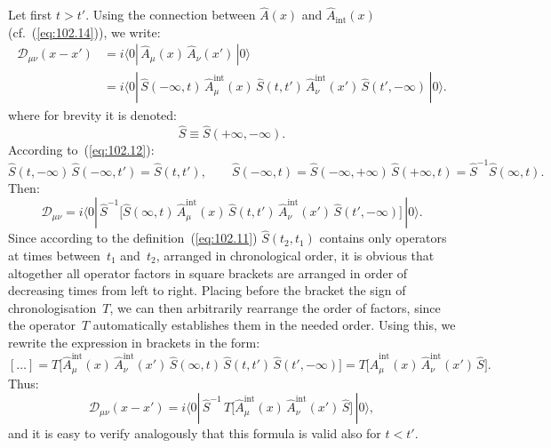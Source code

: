 Let first $t > t'$. Using the connection between $\hat{A}(x)$ and $\hat{A}_{\mathrm{int}}(x)$ (cf.~(\ref{eq:102.14})), we write:
\begin{equation}
\begin{split}
\mathcal{D}_{\mu\nu}(x - x') &= i\langle 0|\,\hat{A}_\mu(x)\,\hat{A}_\nu(x')\,|0\rangle \\
&= i\langle 0|\,\hat{S}(-\infty, t)\,\hat{A}_{\mu}^{\mathrm{int}}(x)\,\hat{S}(t, t')\,\hat{A}_{\nu}^{\mathrm{int}}(x')\,\hat{S}(t', -\infty)\,|0\rangle.
\end{split}
\label{eq:103.3}
\end{equation}
where for brevity it is denoted:
\begin{equation}
\hat{S} \equiv \hat{S}(+\infty, -\infty).
\label{eq:103.4}
\end{equation}
According to~(\ref{eq:102.12}):
\[
\hat{S}(t, -\infty)\,\hat{S}(-\infty, t') = \hat{S}(t, t'),\qquad
\hat{S}(-\infty, t) = \hat{S}(-\infty, +\infty)\,\hat{S}(+\infty, t) = \hat{S}^{-1}\hat{S}(\infty, t).
\]
Then:
\[
\mathcal{D}_{\mu\nu} = i\langle 0|\,\hat{S}^{-1}\bigl[\hat{S}(\infty, t)\,\hat{A}_{\mu}^{\mathrm{int}}(x)\,\hat{S}(t, t')\,\hat{A}_{\nu}^{\mathrm{int}}(x')\,\hat{S}(t', -\infty)\bigr]\,|0\rangle.
\]
Since according to the definition~(\ref{eq:102.11}) $\hat{S}(t_2, t_1)$ contains only operators at times between~$t_1$ and~$t_2$, arranged in chronological order, it is obvious that altogether all operator factors in square brackets are arranged in order of decreasing times from left to right. Placing before the bracket the sign of chronologisation~$T$, we can then arbitrarily rearrange the order of factors, since the operator~$T$ automatically establishes them in the needed order. Using this, we rewrite the expression in brackets in the form:
\[
[\ldots] = T\bigl[\hat{A}_{\mu}^{\mathrm{int}}(x)\,\hat{A}_{\nu}^{\mathrm{int}}(x')\,\hat{S}(\infty, t)\,\hat{S}(t, t')\,\hat{S}(t', -\infty)\bigr] = T\bigl[\hat{A}_{\mu}^{\mathrm{int}}(x)\,\hat{A}_{\nu}^{\mathrm{int}}(x')\,\hat{S}\bigr].
\]
Thus:
\begin{equation}
\mathcal{D}_{\mu\nu}(x - x') = i\langle 0|\,\hat{S}^{-1}\,T\bigl[\hat{A}_{\mu}^{\mathrm{int}}(x)\,\hat{A}_{\nu}^{\mathrm{int}}(x')\,\hat{S}\bigr]\,|0\rangle,
\label{eq:103.5}
\end{equation}
and it is easy to verify analogously that this formula is valid also for $t < t'$.


